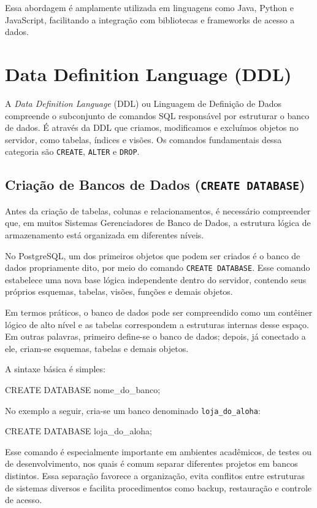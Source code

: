 Essa abordagem é amplamente utilizada em linguagens como Java, Python e JavaScript, facilitando a integração com bibliotecas e frameworks de acesso a dados.

\section{Data Definition Language (DDL)}

A \textit{Data Definition Language} (DDL) ou Linguagem de Definição de Dados compreende o subconjunto de comandos SQL responsável por estruturar o banco de dados. É através da DDL que criamos, modificamos e excluímos objetos no servidor, como tabelas, índices e visões. Os comandos fundamentais dessa categoria são \texttt{CREATE}, \texttt{ALTER} e \texttt{DROP}.

\subsection{Criação de Bancos de Dados (\texttt{CREATE DATABASE})}

Antes da criação de tabelas, colunas e relacionamentos, é necessário compreender que, em muitos Sistemas Gerenciadores de Banco de Dados, a estrutura lógica de armazenamento está organizada em diferentes níveis. 

No PostgreSQL, um dos primeiros objetos que podem ser criados é o banco de dados propriamente dito, por meio do comando \texttt{CREATE DATABASE}. Esse comando estabelece uma nova base lógica independente dentro do servidor, contendo seus próprios esquemas, tabelas, visões, funções e demais objetos.

Em termos práticos, o banco de dados pode ser compreendido como um contêiner lógico de alto nível  e as tabelas correspondem a estruturas internas desse espaço. Em outras palavras, primeiro define-se o banco de dados; depois, já conectado a ele, criam-se esquemas, tabelas e demais objetos. 

A sintaxe básica é simples:

\begin{sqlcode}
CREATE DATABASE nome_do_banco;
\end{sqlcode}

No exemplo a seguir, cria-se um banco denominado \texttt{loja\_do\_aloha}:

\begin{sqlcode}
CREATE DATABASE loja_do_aloha;
\end{sqlcode}

Esse comando é especialmente importante em ambientes acadêmicos, de testes ou de desenvolvimento, nos quais é comum separar diferentes projetos em bancos distintos. Essa separação favorece a organização, evita conflitos entre estruturas de sistemas diversos e facilita procedimentos como backup, restauração e controle de acesso.

